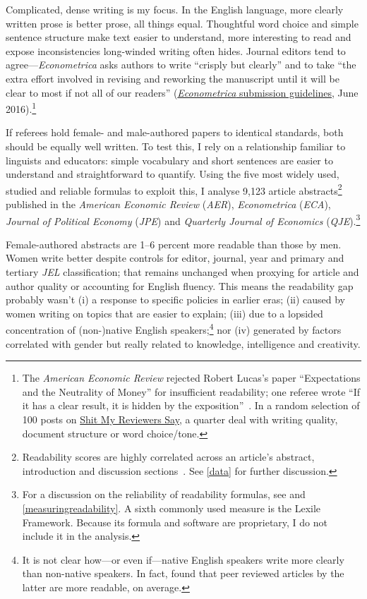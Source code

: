 Complicated, dense writing is my focus. In the English language, more clearly written prose is better prose, all things equal. Thoughtful word choice and simple sentence structure make text easier to understand, more interesting to read and expose inconsistencies long-winded writing often hides. Journal editors tend to agree---\emph{Econometrica} asks authors to write ``crisply but clearly'' and to take ``the extra effort involved in revising and reworking the manuscript until it will be clear to most if not all of our readers'' (\href{http://www.econometricsociety.org/publications/econometrica/information-authors/instructions-submitting-articles}{\emph{Econometrica} submission guidelines}, June 2016).\footnote{The \emph{American Economic Review} rejected Robert Lucas's paper ``Expectations and the Neutrality of Money'' for insufficient readability; one referee wrote ``If it has a clear result, it is hidden by the exposition''~\citep[][p. 172]{Gans1994}. In a random selection of 100 posts on \href{http://shitmyreviewerssay.tumblr.com/submit}{Shit My Reviewers Say}, a quarter deal with writing quality, document structure or word choice\slash tone.}

If referees hold female- and male-authored papers to identical standards, both should be equally well written. To test this, I rely on a relationship familiar to linguists and educators: simple vocabulary and short sentences are easier to understand and straightforward to quantify. Using the five most widely used, studied and reliable formulas to exploit this, I analyse 9,123 article abstracts\footnote{Readability scores are highly correlated across an article's abstract, introduction and discussion sections~\citep{Hartley2003a}. See \autoref{data} for further discussion.} published in the \emph{American Economic Review} (\emph{AER}), \emph{Econometrica} (\emph{ECA}), \emph{Journal of Political Economy} (\emph{JPE}) and \emph{Quarterly Journal of Economics} (\emph{QJE}).\footnote{For a discussion on the reliability of readability formulas, see  \citet{DuBay2004} and \autoref{measuringreadability}. A sixth commonly used measure is the Lexile Framework. Because its formula and software are proprietary, I do not include it in the analysis.}

Female-authored abstracts are 1--6 percent more readable than those by men. Women write better despite controls for editor, journal, year and primary and tertiary \emph{JEL} classification; that remains unchanged when proxying for article and author quality or accounting for English fluency. This means the readability gap probably wasn't (i) a response to specific policies in earlier eras; (ii) caused by women writing on topics that are easier to explain; (iii) due to a lopsided concentration of (non-)native English speakers;\footnote{It is not clear how---or even if---native English speakers write more clearly than non-native speakers. In fact, \citet{Hayden2008} found that peer reviewed articles by the latter are more readable, on average.} nor (iv) generated by factors correlated with gender but really related to knowledge, intelligence and creativity.

